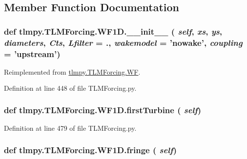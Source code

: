 \subsection{Member Function Documentation}
\hypertarget{classtlmpy_1_1TLMForcing_1_1WF1D_a90bf21d2ff880d26f71e0a5b4b763e1c}{
\subsubsection[{\_\-\_\-init\_\-\_\-}]{\setlength{\rightskip}{0pt plus 5cm}def tlmpy.TLMForcing.WF1D.\_\-\_\-init\_\-\_\- ( {\em self}, \/   {\em xs}, \/   {\em ys}, \/   {\em diameters}, \/   {\em Cts}, \/   {\em Lfilter} = {.}, \/   {\em wakemodel} = {\ttfamily 'nowake'}, \/   {\em coupling} = {\ttfamily 'upstream'})}}
\label{classtlmpy_1_1TLMForcing_1_1WF1D_a90bf21d2ff880d26f71e0a5b4b763e1c}


Reimplemented from \hyperlink{classtlmpy_1_1TLMForcing_1_1WF_a3260ed340bbdd902b712405a0f15371d}{tlmpy.TLMForcing.WF}.

Definition at line 448 of file TLMForcing.py.\hypertarget{classtlmpy_1_1TLMForcing_1_1WF1D_a4df69762d4b58ca9aca466afdc85f38a}{
\subsubsection[{firstTurbine}]{\setlength{\rightskip}{0pt plus 5cm}def tlmpy.TLMForcing.WF1D.firstTurbine ( {\em self})}}
\label{classtlmpy_1_1TLMForcing_1_1WF1D_a4df69762d4b58ca9aca466afdc85f38a}


Definition at line 479 of file TLMForcing.py.\hypertarget{classtlmpy_1_1TLMForcing_1_1WF1D_aa73d3c3b89440c82c1ff782f1691fbbb}{
\subsubsection[{fringe}]{\setlength{\rightskip}{0pt plus 5cm}def tlmpy.TLMForcing.WF1D.fringe ( {\em self})}}
\label{classtlmpy_1_1TLMForcing_1_1WF1D_aa73d3c3b89440c82c1ff782f1691fbbb}


